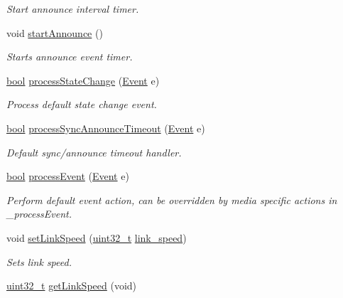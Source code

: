 \begin{DoxyCompactItemize}
\begin{DoxyCompactList}\small\item\em Start announce interval timer. \end{DoxyCompactList}\item 
void \hyperlink{class_common_port_a3119c85c0521ef3f23b4a2419684a015}{start\+Announce} ()
\begin{DoxyCompactList}\small\item\em Starts announce event timer. \end{DoxyCompactList}\item 
\hyperlink{avb__gptp_8h_af6a258d8f3ee5206d682d799316314b1}{bool} \hyperlink{class_common_port_a11047fcdc1e80ee322dba467a051698b}{process\+State\+Change} (\hyperlink{class_event}{Event} e)
\begin{DoxyCompactList}\small\item\em Process default state change event. \end{DoxyCompactList}\item 
\hyperlink{avb__gptp_8h_af6a258d8f3ee5206d682d799316314b1}{bool} \hyperlink{class_common_port_aebebd8986a920f60f1ecc1f8e5a027d0}{process\+Sync\+Announce\+Timeout} (\hyperlink{class_event}{Event} e)
\begin{DoxyCompactList}\small\item\em Default sync/announce timeout handler. \end{DoxyCompactList}\item 
\hyperlink{avb__gptp_8h_af6a258d8f3ee5206d682d799316314b1}{bool} \hyperlink{class_common_port_ac0536467e749cb4bb6b561f562857413}{process\+Event} (\hyperlink{class_event}{Event} e)
\begin{DoxyCompactList}\small\item\em Perform default event action, can be overridden by media specific actions in \+\_\+process\+Event. \end{DoxyCompactList}\item 
void \hyperlink{class_common_port_acecd1ce8f2db0d0160fa026ea30398e5}{set\+Link\+Speed} (\hyperlink{parse_8c_a6eb1e68cc391dd753bc8ce896dbb8315}{uint32\+\_\+t} \hyperlink{class_common_port_aae24fc4f200e75aa8215f797b2561dbf}{link\+\_\+speed})
\begin{DoxyCompactList}\small\item\em Sets link speed. \end{DoxyCompactList}\item 
\hyperlink{parse_8c_a6eb1e68cc391dd753bc8ce896dbb8315}{uint32\+\_\+t} \hyperlink{class_common_port_a78e0f246899dafdde4659c7ed0bb41d1}{get\+Link\+Speed} (void)

\end{DoxyCompactItemize}
